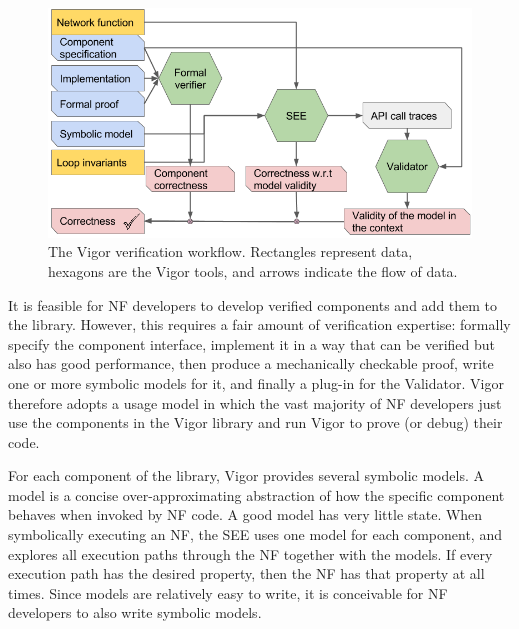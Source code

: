 \documentclass[letterpaper,twocolumn,10pt]{article}
\begin{document}
\begin{figure}[]
    \includegraphics[width=\columnwidth]{figures/vigor_algorithm.png}
    \caption{The Vigor verification workflow. Rectangles represent data, hexagons are the Vigor tools, and arrows indicate the flow of data.}
    \label{fig:algo}
\end{figure}

It is feasible for NF developers to develop verified components and add them to the library. However, this requires a fair amount of verification expertise: formally specify the component interface, implement it in a way that can be verified but also has good performance, then produce a mechanically checkable proof, write one or more symbolic models for it, and finally a plug-in for the Validator. Vigor therefore adopts a usage model in which the vast majority of NF developers just use the components in the Vigor library and run Vigor to prove (or debug) their code.



For each component of the library, Vigor provides several symbolic models. A model is a concise over-approximating abstraction of how the specific component behaves when invoked by NF code. A good model has very little state. When symbolically executing an NF, the SEE uses one model for each component, and explores all execution paths through the NF together with the models. If every execution path has the desired property, then the NF has that property at all times. Since models are relatively easy to write, it is conceivable for NF developers to also write symbolic models.
\end{document}
